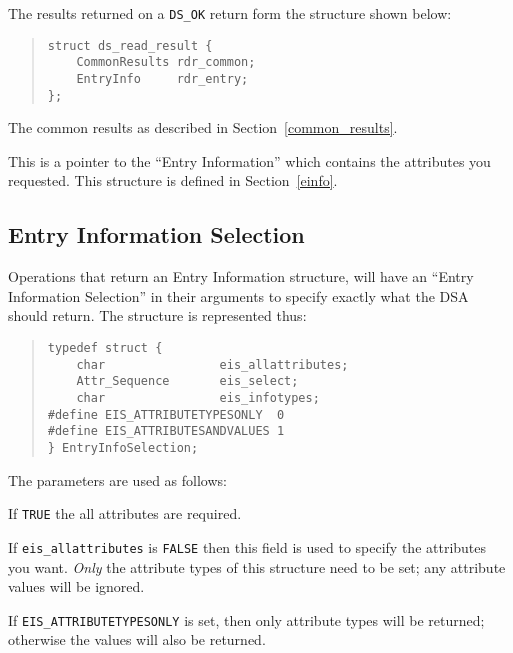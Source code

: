 The results returned on a \verb"DS_OK" return form the structure shown below:

\begin{quote}\small\begin{verbatim}
struct ds_read_result {
    CommonResults rdr_common;
    EntryInfo     rdr_entry;
};
\end{verbatim}\end{quote}

\begin{describe}
\item [\verb"rdr\_common":] The common results as described in
Section~\ref{common_results}.
\item [\verb"rdr\_entry":] This is a pointer to the 
``Entry Information'' which contains the
attributes you requested. This structure is defined in Section~\ref{einfo}.
\end{describe}

\subsection {Entry Information Selection}
\label{eis}

Operations that return an Entry Information structure, will have an ``Entry
Information Selection'' in their arguments to specify exactly what the DSA
should return.   The structure is represented thus:

\begin{quote}\small\begin{verbatim}
typedef struct {
    char                eis_allattributes;
    Attr_Sequence       eis_select;
    char                eis_infotypes;
#define EIS_ATTRIBUTETYPESONLY  0
#define EIS_ATTRIBUTESANDVALUES 1
} EntryInfoSelection;
\end{verbatim}\end{quote}

The parameters are used as follows:
\begin{describe}
\item [\verb"eis\_allattributes":] If \verb"TRUE" the all attributes are
required.
\item [\verb"eis\_select":] If \verb"eis_allattributes" is \verb"FALSE" then
this field is used to specify the attributes you want.
{\em Only} the attribute types of this structure need to be set; any attribute
values will be ignored.
\item [\verb"eis\_infotypes":] If \verb"EIS_ATTRIBUTETYPESONLY" is set, then
only attribute types will be returned; otherwise the
values will also be returned.
\end{describe}

